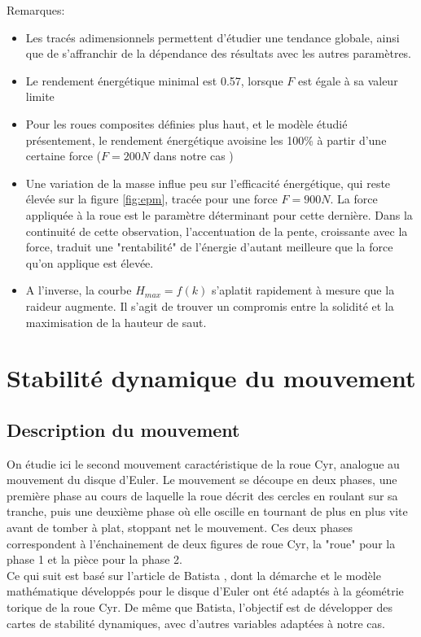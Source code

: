 Remarques:
\begin{itemize}
    \item Les tracés adimensionnels permettent d'étudier une tendance globale, ainsi que de s'affranchir de la dépendance des résultats avec les autres paramètres.
    \item Le rendement énergétique minimal est 0.57, lorsque $F$ est égale à sa valeur limite
    \item Pour les roues composites définies plus haut, et le modèle étudié présentement, le rendement énergétique avoisine les 100\% à partir d'une certaine force ($F=200 N$ dans notre cas )
    \item Une variation de la masse influe peu sur l'efficacité énergétique, qui reste élevée sur la figure \ref{fig:epm}, tracée pour une force $F=900 N$. La force appliquée à la roue est le paramètre déterminant pour cette dernière. Dans la continuité de cette observation, l'accentuation de la pente, croissante avec la force, traduit une "rentabilité" de l'énergie d'autant meilleure que la force qu'on applique est élevée.
    \item A l'inverse, la courbe $H_{max}=f(k)$ s'aplatit rapidement à mesure que la raideur augmente. Il s'agit de trouver un compromis entre la solidité et la maximisation de la hauteur de saut.
\end{itemize}


\section{Stabilité dynamique du mouvement}
\subsection{Description du mouvement}
On étudie ici le second mouvement caractéristique de la roue Cyr, analogue au mouvement du disque d'Euler. Le mouvement se découpe en deux phases, une première phase au cours de laquelle la roue décrit des cercles en roulant sur sa tranche, puis une deuxième phase où elle oscille en tournant de plus en plus vite avant de tomber à plat, stoppant net le mouvement. Ces deux phases correspondent à l'énchainement de deux figures de roue Cyr, la "roue" pour la phase 1 et la pièce pour la phase 2. \\
Ce qui suit est basé sur l'article de Batista \cite{Batista}, dont la démarche et le modèle mathématique développés pour le disque d'Euler ont été adaptés à la géométrie torique de la roue Cyr. De même que Batista, l'objectif est de développer des cartes de stabilité dynamiques, avec d'autres variables adaptées à notre cas.

